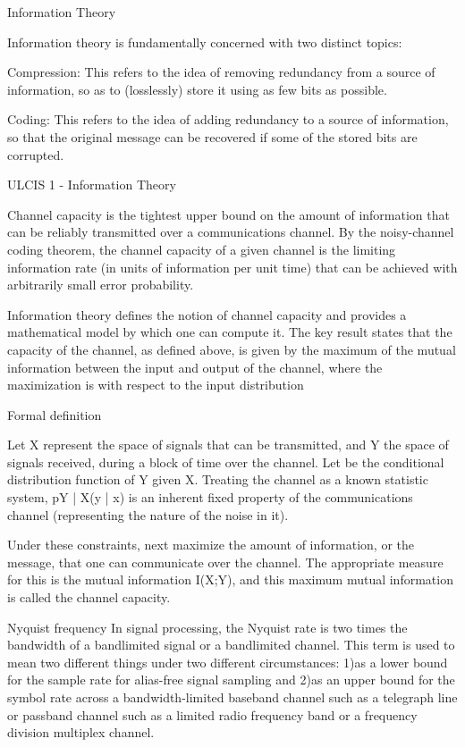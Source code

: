 Information Theory
 
Information theory is fundamentally concerned with two distinct topics:
 
Compression: This refers to the idea of removing redundancy from a source of information, so
as to (losslessly) store it using as few bits as possible.
 
Coding: This refers to the idea of adding redundancy to a source of information, so that the
original message can be recovered if some of the stored bits are corrupted.


ULCIS 1 - Information Theory
 

Channel capacity is the tightest upper bound on the amount of information that can be reliably transmitted over a communications channel. By the noisy-channel coding theorem, the channel capacity of a given channel is the limiting information rate (in units of information per unit time) that can be achieved with arbitrarily small error probability.

Information theory defines the notion of channel capacity and provides a mathematical model by which one can compute it. The key result states that the capacity of the channel, as defined above, is given by the maximum of the mutual information between the input and output of the channel, where the maximization is with respect to the input distribution
 
Formal definition


Let X represent the space of signals that can be transmitted, and Y the space of signals received, during a block of time over the channel. Let
be the conditional distribution function of Y given X. Treating the channel as a known statistic system, pY | X(y | x) is an inherent fixed property of the communications channel (representing the nature of the noise in it).
 
Under these constraints, next maximize the amount of information, or the message, that one can communicate over the channel.
The appropriate measure for this is the mutual information I(X;Y), and this maximum mutual information is called the channel capacity.

Nyquist frequency
In signal processing, the Nyquist rate is two times the bandwidth of a bandlimited signal or a bandlimited channel.
This term is used to mean two different things under two different circumstances:
1)as a lower bound for the sample rate for alias-free signal sampling and
2)as an upper bound for the symbol rate across a bandwidth-limited baseband channel such as a telegraph line
or passband channel such as a limited radio frequency band or a frequency division multiplex channel.
 
